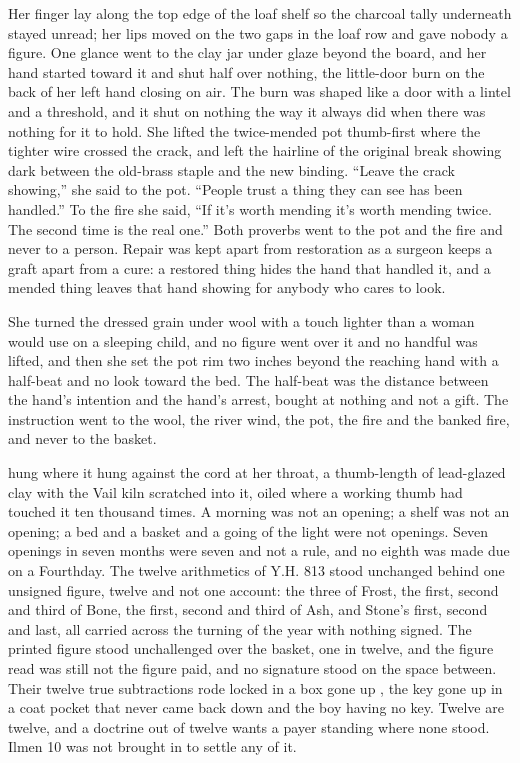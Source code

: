 Her finger lay along the top edge of the loaf shelf so the charcoal tally underneath stayed unread; her lips moved on the two gaps in the loaf row and gave nobody a figure. One glance went to the clay jar under glaze beyond the board, and her hand started toward it and shut half over nothing, the little-door burn on the back of her left hand closing on air. The burn was shaped like a door with a lintel and a threshold, and it shut on nothing the way it always did when there was nothing for it to hold. She lifted the twice-mended pot thumb-first where the tighter wire crossed the crack, and left the hairline of the original break showing dark between the old-brass staple and the new binding. “Leave the crack showing,” she said to the pot. “People trust a thing they can see has been handled.” To the fire she said, “If it's worth mending it's worth mending twice. The second time is the real one.” Both proverbs went to the pot and the fire and never to a person. Repair was kept apart from restoration as a surgeon keeps a graft apart from a cure: a restored thing hides the hand that handled it, and a mended thing leaves that hand showing for anybody who cares to look.

She turned the dressed grain under wool with a touch lighter than a woman would use on a sleeping child, and no figure went over it and no handful was lifted, and then she set the pot rim two inches beyond the reaching hand with a half-beat and no look toward the bed. The half-beat was the distance between the hand's intention and the hand's arrest, bought at nothing and not a gift. The instruction went to the wool, the river wind, the pot, the fire and the banked fire, and never to the basket.

\scenebreak

 hung where it hung against the cord at her throat, a thumb-length of lead-glazed clay with the Vail kiln scratched into it, oiled where a working thumb had touched it ten thousand times. A morning was not an opening; a shelf was not an opening; a bed and a basket and a going of the light were not openings. Seven openings in seven months were seven and not a rule, and no eighth was made due on a Fourthday. The twelve arithmetics of Y.H. 813 stood unchanged behind one unsigned figure, twelve and not one account: the three of Frost, the first, second and third of Bone, the first, second and third of Ash, and Stone's first, second and last, all carried across the turning of the year with nothing signed. The printed figure stood unchallenged over the basket, one in twelve, and the figure read was still not the figure paid, and no signature stood on the space between. Their twelve true subtractions rode locked in a box gone up , the key gone up in a coat pocket that never came back down and the boy having no key. Twelve are twelve, and a doctrine out of twelve wants a payer standing where none stood. Ilmen 10 was not brought in to settle any of it.

